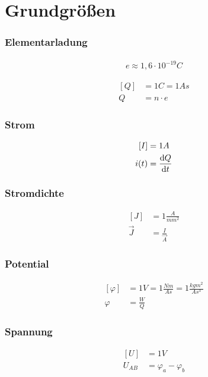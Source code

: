 \section{Grundgrößen}

\subsubsection{Elementarladung}
\begin{multicols}{2}{}
\begin{align*}
e\approx 1,6\cdot 10^{-19}C
\end{align*}
\hfill

\begin{align*}
\left[Q\right]&=1C=1As\\
Q&=n\cdot e
\end{align*}
\end{multicols}


\begin{multicols}{2}{}
\subsubsection{Strom}
\begin{align*}
\left[I\right]&=1A\\
i(t)&=\frac{\mathop{}\!\mathrm{d} Q}{\mathop{}\!\mathrm{d} t}
\end{align*}

\subsubsection{Stromdichte}
\begin{align*}
\left[J\right]&=1\frac{A}{mm^2}\\
\vec{J}&=\frac{I}{\vec{A}}
\end{align*}
\end{multicols}


\begin{multicols}{2}{}
\subsubsection{Potential}
\begin{align*}
\left[\varphi\right]&=1V=1\frac{Nm}{As}=1\frac{kgm^2}{As^3}\\
\varphi&=\frac{W}{Q}
\end{align*}

\subsubsection{Spannung}
\begin{align*}
\left[U\right]&=1V\\
U_{AB}&=\varphi_a-\varphi_b
\end{align*}
\hfill
\end{multicols}

